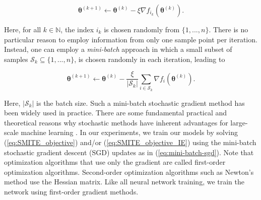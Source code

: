 \documentclass{article}
\begin{document}
\begin{equation}
    \boldsymbol{\theta}^{(k+1)} \leftarrow \boldsymbol{\theta}^{(k)} - \xi \nabla f_{i_k} (\boldsymbol{\theta}^{(k)}).
\end{equation}

Here, for all $k \in \mathbb{N}$, the index $i_k$ is chosen randomly from $\{1,...,n\}$. There is no particular reason to employ information from only one sample point per iteration. Instead, one can employ a {\it mini-batch} approach in which a small subset of samples $\mathcal{S}_k \subseteq \{1, ..., n\}$, is chosen randomly in each iteration, leading to

\begin{equation}
    \boldsymbol{\theta}^{(k+1)} \leftarrow \boldsymbol{\theta}^{(k)} - \frac{\xi}{|\mathcal{S}_k|} \sum_{i \in \mathcal{S}_k} \nabla f_{i} (\boldsymbol{\theta}^{(k)}).
    \label{eq:mini-batch-sgd}
\end{equation}

Here, $|\mathcal{S}_k|$ is the batch size. Such a mini-batch stochastic gradient method has been widely used in practice.  There are some fundamental practical and theoretical reasons why stochastic methods have inherent advantages for large-scale machine learning \citep{bottou2018optimization}. In our experiments, we train our models by solving (\ref{eq:SMITE_objective}) and/or (\ref{eq:SMITE_objective_IE}) using the mini-batch stochastic gradient descent (SGD) updates as in (\ref{eq:mini-batch-sgd}). Note that optimization algorithms that use only the gradient are called first-order optimization algorithms. Second-order optimization algorithms such as Newton's method use the Hessian matrix. Like all neural network training, we train the network using first-order gradient methods. 



%
\end{document}
